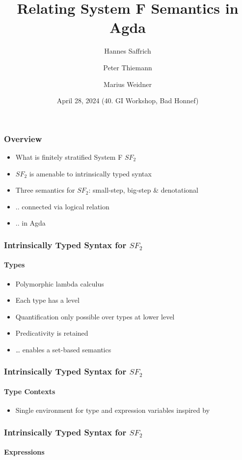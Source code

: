 \documentclass[dvipsnames,aspectratio=169,pdftex]{beamer}
\title{Relating System F Semantics in Agda}
\author[Saffrich, Thiemann, Weidner] {
  Hannes Saffrich \and 
  Peter Thiemann \and
  Marius Weidner
}
\institute{University of Freiburg}
\date{April 28, 2024 (40. GI Workshop, Bad Honnef)}
\begin{document}
\begin{frame}{\null}
  \titlepage 
\end{frame}

\begin{frame}[fragile]
  \frametitle{Overview}
  \begin{itemize}
    \item What is finitely stratified System F $SF_2$ \cite{DBLP:journals/iandc/Leivant91}
    \item $SF_2$ is amenable to intrinsically typed syntax
    \item Three semantics for $SF_2$: small-step, big-step \& denotational
    \item .. connected via logical relation
    \item .. in Agda
  \end{itemize}
\end{frame}

\begin{frame}
  \frametitle{Intrinsically Typed Syntax for $SF_2$}
  \framesubtitle{Types}
  \TFLEnv
  \vspace{-5mm}
  \TFType
  \vspace{-5mm}
  \begin{itemize}
    \item Polymorphic lambda calculus \cite{girard72:_inter,DBLP:conf/programm/Reynolds74}
    \item Each type has a level
    \item Quantification only possible over types at lower level
    \item Predicativity is retained
    \item \dots{} enables a set-based semantics
  \end{itemize}
\end{frame}

\begin{frame}
  \frametitle{Intrinsically Typed Syntax for $SF_2$}
  \framesubtitle{Type Contexts}
  \TFTVEnv
  \TFinn
  \begin{itemize}
    \item Single environment for type and expression variables inspired by \cite{DBLP:conf/mpc/ChapmanKNW19}
  \end{itemize}
\end{frame}

\begin{frame}
  \frametitle{Intrinsically Typed Syntax for $SF_2$}
  \framesubtitle{Expressions}
  \TFExprExcerpt
\end{frame}
\end{document}
